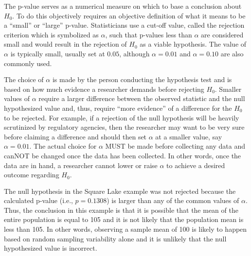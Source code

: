 \documentclass[10pt,openany]{book}\usepackage[]{graphicx}\usepackage[]{color}
\begin{document}

The p-value serves as a numerical measure on which to base a conclusion about $H_{0}$.  To do this objectively requires an objective definition of what it means to be a ``small'' or ``large'' p-value.  Statisticians use a cut-off value, called the rejection criterion which is symbolized as $\alpha$, such that p-values less than $\alpha$ are considered small and would result in the rejection of $H_{0}$ as a viable hypothesis.  The value of $\alpha$ is typically small, usually set at $0.05$, although $\alpha=0.01$ and $\alpha=0.10$ are also commonly used.


\vspace{-12pt}

The choice of $\alpha$ is made by the person conducting the hypothesis test and is based on how much evidence a researcher demands before rejecting $H_{0}$.  Smaller values of $\alpha$ require a larger difference between the observed statistic and the null hypothesized value and, thus, require ``more evidence'' of a difference for the $H_{0}$ to be rejected.  For example, if a rejection of the null hypothesis will be heavily scrutinized by regulatory agencies, then the researcher may want to be very sure before claiming a difference and should then set $\alpha$ at a smaller value, say $\alpha=0.01$.  The actual choice for $\alpha$ MUST be made before collecting any data and canNOT be changed once the data has been collected.  In other words, once the data are in hand, a researcher cannot lower or raise $\alpha$ to achieve a desired outcome regarding $H_{0}$.


\vspace{-12pt}

The null hypothesis in the Square Lake example was not rejected because the calculated p-value (i.e., $p=0.1308$) is larger than any of the common values of $\alpha$.  Thus, the conclusion in this example is that it is possible that the mean of the entire population is equal to 105 and it is not likely that the population mean is less than 105.  In other words, observing a sample mean of 100 is likely to happen based on random sampling variability alone and it is unlikely that the null hypothesized value is incorrect.
\end{document}
